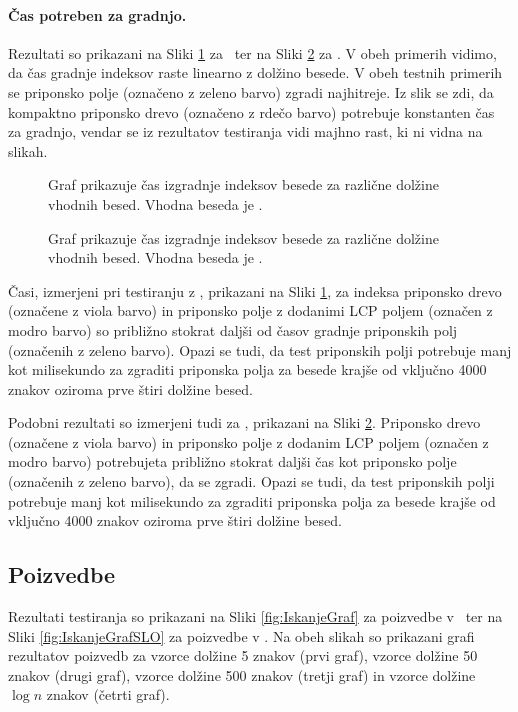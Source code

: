 \paragraph{Čas potreben za gradnjo.} 

Rezultati so prikazani na Sliki \ref{fig:IzgradnjaGraf} za \DNK\ ter na Sliki \ref{fig:IzgradnjaGrafSLO} za \NK. V obeh primerih vidimo, da čas gradnje indeksov raste linearno z dolžino besede. V obeh testnih primerih se priponsko polje (označeno z zeleno barvo) zgradi najhitreje. Iz slik se zdi, da kompaktno priponsko drevo (označeno z rdečo barvo) potrebuje konstanten čas za gradnjo, vendar se iz rezultatov testiranja vidi majhno rast, ki ni vidna na slikah.

\begin{figure}[htb]
    \centering
    
    \caption{Graf prikazuje čas izgradnje indeksov besede za različne dolžine vhodnih besed. Vhodna beseda je \DNK.} 
    \label{fig:IzgradnjaGraf}
\end{figure}

\begin{figure}[htb]
    \centering
    
    \caption{Graf prikazuje čas izgradnje indeksov besede za različne dolžine vhodnih besed. Vhodna beseda je \NK.} 
    \label{fig:IzgradnjaGrafSLO}
\end{figure}

Časi, izmerjeni pri testiranju z \DNK, prikazani na Sliki \ref{fig:IzgradnjaGraf}, za indeksa priponsko drevo (označene z viola barvo) in priponsko polje z dodanimi LCP poljem (označen z modro barvo) so približno stokrat daljši od časov gradnje priponskih polj (označenih z zeleno barvo). Opazi se tudi, da test priponskih polji potrebuje manj kot milisekundo za zgraditi priponska polja za besede krajše od vključno 4000 znakov oziroma prve štiri dolžine besed.

Podobni rezultati so izmerjeni tudi za \NK, prikazani na Sliki \ref{fig:IzgradnjaGrafSLO}. Priponsko drevo (označene z viola barvo) in priponsko polje z dodanim LCP poljem (označen z modro barvo) potrebujeta približno stokrat daljši čas kot priponsko polje (označenih z zeleno barvo), da se zgradi. Opazi se tudi, da test priponskih polji potrebuje manj kot milisekundo za zgraditi priponska polja za besede krajše od vključno 4000 znakov oziroma prve štiri dolžine besed.


\subsection{Poizvedbe}
Rezultati testiranja so prikazani na Sliki \ref{fig:IskanjeGraf} za poizvedbe v \DNK\ ter na Sliki \ref{fig:IskanjeGrafSLO} za poizvedbe v \NK. Na obeh slikah so prikazani grafi rezultatov poizvedb za vzorce dolžine 5 znakov (prvi graf), vzorce dolžine 50 znakov (drugi graf), vzorce dolžine 500 znakov (tretji graf) in vzorce dolžine $\log{n}$ znakov (četrti graf).

